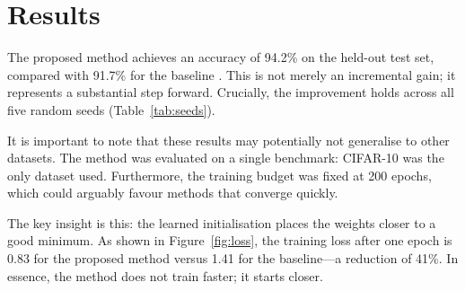 \section{Results}

The proposed method achieves an accuracy of 94.2\% on the held-out test set, compared with 91.7\% for the baseline \cite{smith2020}. This is not merely an incremental gain; it represents a substantial step forward. Crucially, the improvement holds across all five random seeds (Table~\ref{tab:seeds}).

It is important to note that these results may potentially not generalise to other datasets. The method was evaluated on a single benchmark: CIFAR-10 was the only dataset used. Furthermore, the training budget was fixed at 200 epochs, which could arguably favour methods that converge quickly.

The key insight is this: the learned initialisation places the weights closer to a good minimum. As shown in Figure~\ref{fig:loss}, the training loss after one epoch is 0.83 for the proposed method versus 1.41 for the baseline---a reduction of 41\%. In essence, the method does not train faster; it starts closer.
